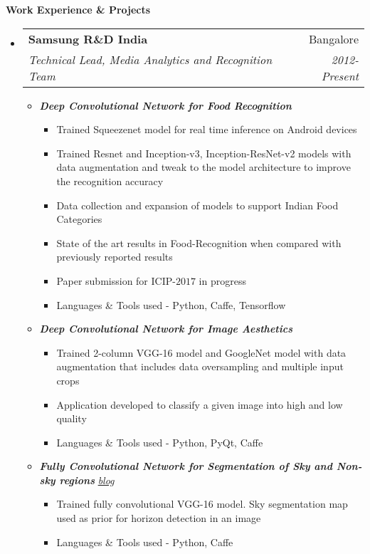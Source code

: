 \documentclass[letterpaper,11pt]{article}
\makeatletter
\newcommand{\resitem}[1]{\item #1 \vspace{-2pt}}
\newcommand{\resheading}[1]{{\large \colorbox{mygrey}{\begin{minipage}{\textwidth}{\textbf{#1 \vphantom{p\^{E}}}}\end{minipage}}}}
\newcommand{\ressubheading}[4]{
	\begin{tabular*}{7.0in}{l@{\extracolsep{\fill}}r}
		\textbf{#1} & #2 \\
		\textit{#3} & \textit{#4} \\
	\end{tabular*}\vspace{-6pt}}
\makeatother
\begin{document}
\resheading{Work Experience \& Projects}
\begin{itemize}
	\item
		\ressubheading{Samsung R\&D India}{Bangalore}{Technical Lead, Media Analytics and Recognition Team}{2012-Present}
		\vspace{4mm}
		\begin{itemize}
				\resitem[]{\faCircleO
					\hspace{1mm}\textbf{\emph{Deep Convolutional Network for Food Recognition}}\hspace{1mm}}
				\begin{itemize}
						\resitem{Trained Squeezenet model for real time inference on Android devices}
						\resitem{Trained Resnet and Inception-v3, Inception-ResNet-v2 models with data augmentation and tweak to the model architecture to improve the recognition accuracy}
						\resitem{Data collection and expansion of models to support Indian Food Categories}
						\resitem{State of the art results in Food-Recognition when compared with previously reported results}
						\resitem{Paper submission for ICIP-$2017$ in progress}
						\resitem{Languages \& Tools used - Python, Caffe, Tensorflow}
				\end{itemize}
				\vspace{2.5mm}
				\resitem[]{\faCircleO
					\hspace{1mm}\textbf{\emph{Deep Convolutional Network for Image Aesthetics}}\hspace{1mm}}
				\begin{itemize}
						\resitem{Trained 2-column VGG-16 model and GoogleNet model with data augmentation that includes data oversampling and multiple input crops}
						\resitem{Application developed to classify a given image into high and low quality}
						\resitem{Languages \& Tools used - Python, PyQt, Caffe}
				\end{itemize}
				\vspace{2.5mm}
				\resitem[]{\faCircleO
					\hspace{1mm}\textbf{\emph{Fully Convolutional Network for Segmentation of Sky and Non-sky regions}}\hspace{1mm}
					\faGlobe \hspace{1mm} \href{https://nrupatunga.github.io/fcn-segmentation/}{\emph{blog}}}
				\begin{itemize}
						\resitem{Trained fully convolutional VGG-16 model. Sky segmentation map used as prior for horizon detection in an image}
						\resitem{Languages \& Tools used - Python, Caffe}

\end{itemize}
\end{itemize}
\end{itemize}
\end{document}
